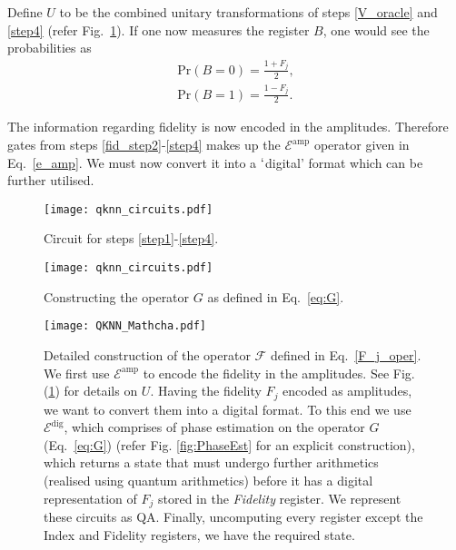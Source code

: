 \documentclass[a4paper,twocolumn,11pt,unpublished]{quantumarticle}
\begin{document}
\begin{enumerate}
            Define $U$ to be the combined unitary transformations of steps \ref{V_oracle} and \ref{step4} (refer Fig.~\ref{fig:U_circuit}). If one now measures the register $B$, one would see the probabilities as    
            \begin{gather}
                \text{Pr}(B = 0) = \frac{1+F_j}{2}, \\ \text{Pr}( B = 1) = \frac{1-F_j}{2}.
            \end{gather}
        
        The information regarding fidelity is now encoded in the amplitudes. Therefore gates from steps \ref{fid_step2}-\ref{step4} makes up the $\mathcal{E}^\text{amp}$ operator given in Eq.~\eqref{e_amp}.  We must now convert it into a $\lq$digital' format which can be further utilised. 
        
        
            \begin{figure}
                \begin{center} 
                    \texttt{[image: qknn\_circuits.pdf]}
                    \caption{Circuit for steps \ref{step1}-\ref{step4}.} \label{fig:U_circuit}
                \end{center}
            \end{figure}

            
            \begin{figure}
                    \begin{center} 
                        \texttt{[image: qknn\_circuits.pdf]}
                        \caption{Constructing the operator $G$ as defined in Eq.~\eqref{eq:G}.} \label{fig:Gcircuit}
                    \end{center}
            \end{figure}
            


                
            \begin{figure*}
                \begin{center}
                    \texttt{[image: QKNN\_Mathcha.pdf]}
                    \caption{Detailed construction of the operator $\mathcal F$ defined in Eq.~\eqref{F_j_oper}. We first use $\mathcal E^{\text{amp}}$ to encode the fidelity in the amplitudes. See Fig. (\ref{fig:U_circuit}) for details on $U$. Having the fidelity $F_j$ encoded as amplitudes, we want to convert them into a digital format. To this end we use $\mathcal E^{\text{dig}}$, which comprises of phase estimation on the operator $G$ (Eq.~\eqref{eq:G}) (refer Fig. \ref{fig:PhaseEst} for an explicit construction), which returns a state that must undergo further arithmetics (realised using quantum arithmetics) before it has a digital representation of $F_j$ stored in the \textit{Fidelity} register. We represent these circuits as QA. Finally, uncomputing every register except the Index and Fidelity registers, we have the required state.} 
                    \label{fig:Fcircuit}
                \end{center}
            \end{figure*}


\end{enumerate}
\end{document}
